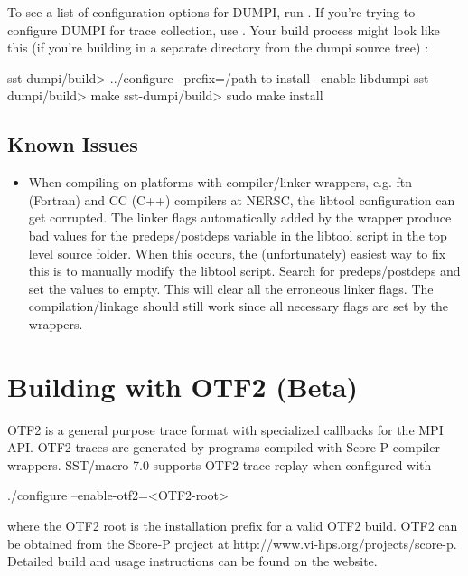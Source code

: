 To see a list of configuration options for DUMPI, run .  
If you're trying to configure DUMPI for trace collection, use .
Your build process might look like this (if you're building in a separate directory from the dumpi source tree) :

\begin{ShellCmd}
sst-dumpi/build> ../configure --prefix=/path-to-install --enable-libdumpi
sst-dumpi/build> make
sst-dumpi/build> sudo make install
\end{ShellCmd}

\subsection{Known Issues}
\label{subsubsec:building:dumpi:issues}

\begin{itemize}
\item When compiling on platforms with compiler/linker wrappers, e.g. ftn (Fortran) and CC (C++) compilers 
at NERSC, the libtool configuration can get corrupted.  The linker flags automatically added by the 
wrapper produce bad values for the predeps/postdeps variable in the libtool script in the top 
level source folder.  When this occurs, the (unfortunately) easiest way to fix this is to manually modify
the libtool script.  Search for predeps/postdeps and set the values to empty.
This will clear all the erroneous linker flags.  The compilation/linkage should still work since 
all necessary flags are set by the wrappers. 
\end{itemize}

\section{Building with OTF2 (Beta)}
\label{sec:buildingOtf2}
OTF2 is a general purpose trace format with specialized callbacks for the MPI API. OTF2 traces are generated by programs compiled with Score-P compiler wrappers. SST/macro 7.0 supports OTF2 trace replay when configured with 

\begin{ViFile}
./configure --enable-otf2=<OTF2-root>	
\end{ViFile}
where the OTF2 root is the installation prefix for a valid OTF2 build. OTF2 can be obtained from the Score-P project at {http://www.vi-hps.org/projects/score-p}.
Detailed build and usage instructions can be found on the website.


